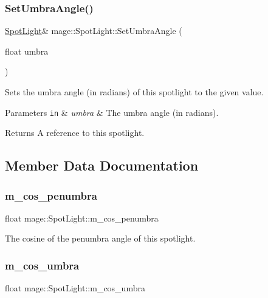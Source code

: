 \subsubsection{\texorpdfstring{Set\+Umbra\+Angle()}{SetUmbraAngle()}}
{\footnotesize\ttfamily \hyperlink{classmage_1_1_spot_light}{Spot\+Light}\& mage\+::\+Spot\+Light\+::\+Set\+Umbra\+Angle (\begin{DoxyParamCaption}\item[{float}]{umbra }\end{DoxyParamCaption})}

Sets the umbra angle (in radians) of this spotlight to the given value.


\begin{DoxyParams}[1]{Parameters}
\mbox{\tt in}  & {\em umbra} & The umbra angle (in radians). \\
\hline
\end{DoxyParams}
\begin{DoxyReturn}{Returns}
A reference to this spotlight. 
\end{DoxyReturn}


\subsection{Member Data Documentation}
\hypertarget{classmage_1_1_spot_light_ac5d9f3426397abff72c5098b6e7e8472}{}\label{classmage_1_1_spot_light_ac5d9f3426397abff72c5098b6e7e8472} 
\subsubsection{\texorpdfstring{m\+\_\+cos\+\_\+penumbra}{m\_cos\_penumbra}}
{\footnotesize\ttfamily float mage\+::\+Spot\+Light\+::m\+\_\+cos\+\_\+penumbra\hspace{0.3cm}{\ttfamily [private]}}

The cosine of the penumbra angle of this spotlight. \hypertarget{classmage_1_1_spot_light_a9afab31514f93d702f9e516491f262f2}{}\label{classmage_1_1_spot_light_a9afab31514f93d702f9e516491f262f2} 
\subsubsection{\texorpdfstring{m\+\_\+cos\+\_\+umbra}{m\_cos\_umbra}}
{\footnotesize\ttfamily float mage\+::\+Spot\+Light\+::m\+\_\+cos\+\_\+umbra\hspace{0.3cm}{\ttfamily [private]}}

